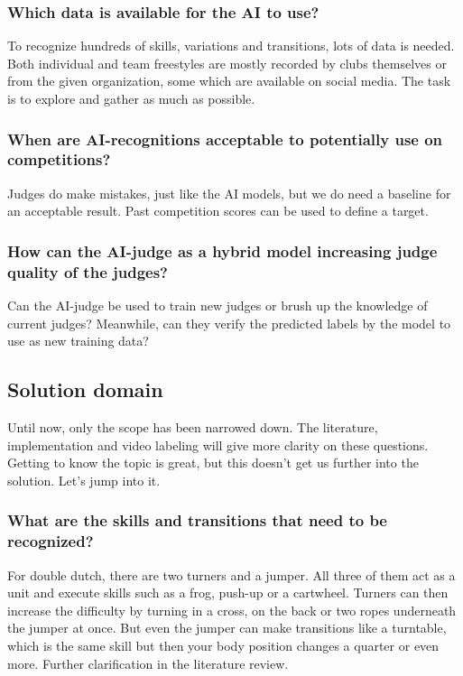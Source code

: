 \subsubsection{Which data is available for the AI to use?}
\label{subsubsec:intro-question-data}

To recognize hundreds of skills, variations and transitions, lots of data is needed. Both individual and team freestyles are mostly recorded by clubs themselves or from the given organization, some which are available on social media. The task is to explore and gather as much as possible.

\subsubsection{When are AI-recognitions acceptable to potentially use on competitions?}
\label{subsubsec:intro-question-acceptable-results}

Judges do make mistakes, just like the AI models, but we do need a baseline for an acceptable result. Past competition scores can be used to define a target.

\subsubsection{How can the AI-judge as a hybrid model increasing judge quality of the judges?}
\label{subsubsec:intro-question-hybrid-model-judge-quality}
Can the AI-judge be used to train new judges or brush up the knowledge of current judges? Meanwhile, can they verify the predicted labels by the
model to use as new training data?


\subsection{Solution domain}
\label{subsec:intro-solution-domain}

Until now, only the scope has been narrowed down. The literature, implementation and video labeling will give more clarity on these questions. Getting to know the topic is great, but this doesn't get us further into the solution. Let's jump into it.

\subsubsection{What are the skills and transitions that need to be recognized?}
\label{subsubsec:intro-question-what-are-the-skill}

For double dutch, there are two turners and a jumper. All three of them act as a unit and execute skills such as a frog, push-up or a cartwheel. Turners can then increase the difficulty by turning in a cross, on the back or two ropes underneath the jumper at once. But even the jumper can make transitions like a turntable, which is the same skill but then your body position changes a quarter or even more. Further clarification in the literature review.

